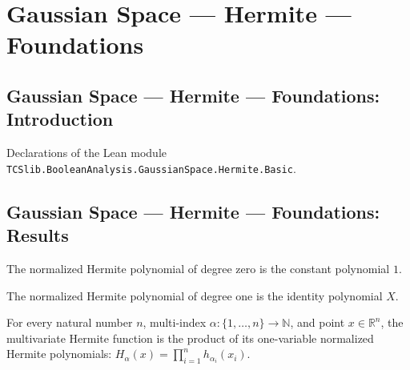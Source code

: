 \section{Gaussian Space --- Hermite --- Foundations}
\subsection*{Gaussian Space --- Hermite --- Foundations: Introduction}

Declarations of the Lean module \texttt{TCSlib.BooleanAnalysis.GaussianSpace.Hermite.Basic}.

\subsection*{Gaussian Space --- Hermite --- Foundations: Results}

\begin{theorem}
\label{BooleanAnalysis.GaussianSpace.normalizedHermitePolynomial_zero}
\leanok
{}
The normalized Hermite polynomial of degree zero is the constant polynomial $1$.
\end{theorem}

\begin{theorem}
\label{BooleanAnalysis.GaussianSpace.normalizedHermitePolynomial_one}
\leanok
{}
The normalized Hermite polynomial of degree one is the identity polynomial $X$.
\end{theorem}

\begin{theorem}
\label{BooleanAnalysis.GaussianSpace.hermiteFunction_eq_prod}
\leanok
{}
For every natural number $n$, multi-index $\alpha:\{1,\ldots,n\}\to\mathbb N$, and point
$x\in\mathbb R^n$, the multivariate Hermite function is the product of its one-variable
normalized Hermite polynomials: $H_\alpha(x)=\prod_{i=1}^n h_{\alpha_i}(x_i)$.
\end{theorem}

